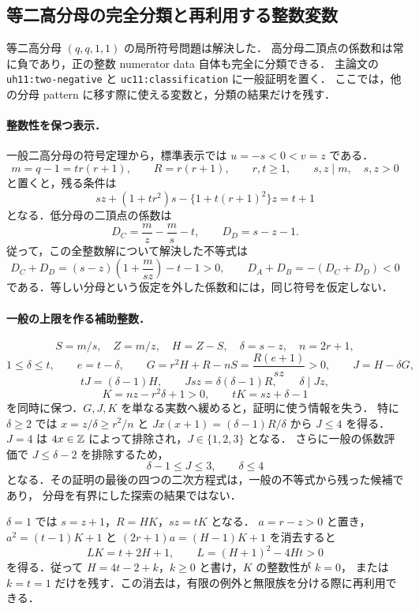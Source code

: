 \subsection{等二高分母の完全分類と再利用する整数変数}
\label{uh10:two-reduction-section}

等二高分母 $(q,q,1,1)$ の局所符号問題は解決した．
高分母二頂点の係数和は常に負であり，正の整数 numerator data 自体も完全に分類できる．
主論文の \texttt{uh11:two-negative} と \texttt{uc11:classification} に一般証明を置く．
ここでは，他の分母 pattern に移す際に使える変数と，分類の結果だけを残す．

\paragraph{整数性を保つ表示．}
一般二高分母の符号定理から，標準表示では $u=-s<0<v=z$ である．
\[
 m=q-1=t r(r+1),\qquad R=r(r+1),\qquad r,t\geq1,
 \qquad s,z\mid m,\quad s,z>0
\]
と置くと，残る条件は
\begin{equation}\label{nt11:two-conic}
 sz+(1+tr^2)s-\{1+t(r+1)^2\}z=t+1
\end{equation}
となる．低分母の二頂点の係数は
\[
 D_C=\frac mz-\frac ms-t,\qquad D_D=s-z-1.
\]
従って，この全整数解について解決した不等式は
\[
 D_C+D_D=(s-z)\left(1+\frac m{sz}\right)-t-1>0,
 \qquad D_A+D_B=-(D_C+D_D)<0
\]
である．等しい分母という仮定を外した係数和には，同じ符号を仮定しない．

\paragraph{一般の上限を作る補助整数．}
\[
 S=m/s,\quad Z=m/z,\quad H=Z-S,\quad
 \delta=s-z,\quad n=2r+1,
\]
\[
 1\leq\delta\leq t,\qquad e=t-\delta,\qquad
 G=r^2H+R-nS=\frac{R(e+1)}{sz}>0,\qquad J=H-\delta G,
\]
\[
 tJ=(\delta-1)H,\qquad Jsz=\delta(\delta-1)R,
 \qquad\delta\mid Jz,
\]
\[
 K=nz-r^2\delta+1>0,
 \qquad tK=sz+\delta-1
\]
を同時に保つ．$G,J,K$ を単なる実数へ緩めると，証明に使う情報を失う．
特に $\delta\geq2$ では $x=z/\delta\geq r^2/n$ と
$Jx(x+1)=(\delta-1)R/\delta$ から $J\leq4$ を得る．
$J=4$ は $4x\in\mathbb Z$ によって排除され，$J\in\{1,2,3\}$ となる．
さらに一般の係数評価で $J\leq\delta-2$ を排除するため，
\[
 \delta-1\leq J\leq3,\qquad \delta\leq4
\]
となる．その証明の最後の四つの二次方程式は，一般の不等式から残った候補であり，
分母を有界にした探索の結果ではない．

$\delta=1$ では $s=z+1$，$R=HK$，$sz=tK$ となる．
$a=r-z>0$ と置き，$a^2=(t-1)K+1$ と $(2r+1)a=(H-1)K+1$ を消去すると
\[
 LK=t+2H+1,\qquad L=(H+1)^2-4Ht>0
\]
を得る．従って $H=4t-2+k$，$k\geq0$ と書け，$K$ の整数性が $k=0$，
または $k=t=1$ だけを残す．この消去は，有限の例外と無限族を分ける際に再利用できる．

